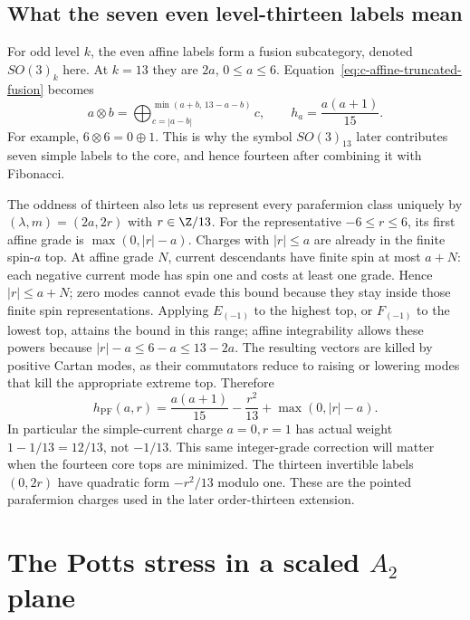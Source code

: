 \subsection{What the seven even level-thirteen labels mean}
\label{sec:c-pf-grade}
For odd level $k$, the even affine labels form a fusion subcategory,
denoted $SO(3)_k$ here. At $k=13$ they are $2a$, $0\le a\le6$.
Equation~\eqref{eq:c-affine-truncated-fusion} becomes
\[
 a\otimes b=
 \bigoplus_{c=|a-b|}^{\min(a+b,\,13-a-b)}c,
 \qquad h_a=\frac{a(a+1)}{15}.
\]
For example, $6\otimes6=0\oplus1$. This is why the symbol
$SO(3)_{13}$ later contributes seven simple labels to the core,
and hence fourteen after combining it with Fibonacci.

The oddness of thirteen also lets us represent every
parafermion class uniquely by $(\lambda,m)=(2a,2r)$ with
$r\in\Z/13$. For the representative $-6\le r\le6$, its first
affine grade is $\max(0,|r|-a)$. Charges with $|r|\le a$ are
already in the finite spin-$a$ top. At affine grade $N$, current
descendants have finite spin at most $a+N$: each negative current
mode has spin one and costs at least one grade. Hence
$|r|\le a+N$; zero modes cannot evade this bound because they stay
inside those finite spin representations. Applying $E_{(-1)}$ to
the highest top, or $F_{(-1)}$ to the lowest top, attains the bound
in this range; affine
integrability allows these powers because
$|r|-a\le6-a\le13-2a$. The resulting vectors are killed by
positive Cartan modes, as their commutators reduce to raising or
lowering modes that kill the appropriate extreme top. Therefore
\[
 h_{\mathrm{PF}}(a,r)=\frac{a(a+1)}{15}
                   -\frac{r^2}{13}+\max(0,|r|-a).
\]
In particular the simple-current charge $a=0,r=1$ has actual
weight $1-1/13=12/13$, not $-1/13$. This same integer-grade
correction will matter when the fourteen core tops are minimized.
The thirteen invertible labels $(0,2r)$ have quadratic form
$-r^2/13$ modulo one. These are the pointed parafermion charges
used in the later order-thirteen extension.

\section{\texorpdfstring{The Potts stress in a scaled $A_2$ plane}{The Potts stress in a scaled A2 plane}}

